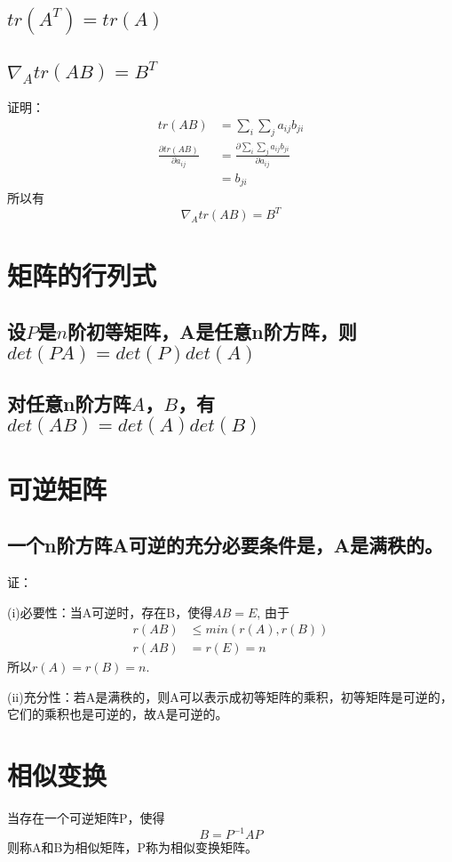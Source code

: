 \documentclass[]{article}
\begin{document}
\subsection{$ tr(A^T)=tr(A) $}

\subsection{$ \nabla_A tr(AB) = B^T $}
证明：
\[
\begin{aligned}
tr(AB) &= \sum_i \sum_j a_{ij} b_{ji} \\
\frac{\partial tr(AB)}{\partial a_{ij}} &= \frac{\partial \sum_i \sum_j a_{ij} b_{ji}}{\partial a_{ij}} \\
&= b_{ji}
\end{aligned}
 \]
所以有
\[ 
\nabla_A tr(AB) = B^T
 \]

\section{矩阵的行列式}
\subsection{设$ P $是$ n $阶初等矩阵，A是任意n阶方阵，则$ det(PA)=det(P)det(A) $}
\subsection{对任意n阶方阵$ A $，$ B $，有$ det(AB)=det(A)det(B) $}

\section{可逆矩阵}
\subsection{一个n阶方阵A可逆的充分必要条件是，A是满秩的。}
证：

(i)必要性：当A可逆时，存在B，使得$ AB=E $, 由于
\[
\begin{aligned}
r(AB) &\leq min(r(A), r(B)) \\
r(AB) &= r(E) = n 
\end{aligned}
\]
所以$ r(A) = r(B) = n $.

(ii)充分性：若A是满秩的，则A可以表示成初等矩阵的乘积，初等矩阵是可逆的，它们的乘积也是可逆的，故A是可逆的。

\section{相似变换}
当存在一个可逆矩阵P，使得
\[ 
B = P^{-1}AP
 \]
则称A和B为相似矩阵，P称为相似变换矩阵。
\end{document}
